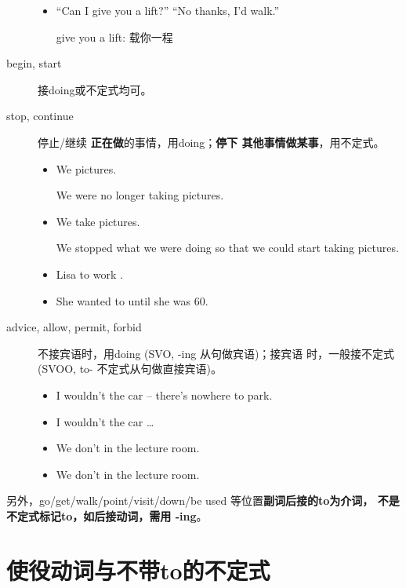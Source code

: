 \begin{description}
\begin{itemize}
  \item ``Can I give you a lift?'' ``No thanks, I'd  walk.''

    give you a lift: 载你一程
  \end{itemize}

\item[begin, start] 接doing或不定式均可。

\item[stop, continue] 停止/继续 \textbf{正在做}的事情，用doing；\textbf{停下
    其他事情做某事}，用不定式。
  \begin{itemize}
  \item We  pictures.

    We were no longer taking pictures.

  \item We  take pictures.

    We stopped what we were doing so that we could start taking pictures.

  \item Lisa  to work .

  \item She wanted to  until she was 60.
  \end{itemize}

\item[advice, allow, permit, forbid] 不接宾语时，用doing (SVO, -ing 从句做宾语)；接宾语
  时，一般接不定式 (SVOO, to- 不定式从句做直接宾语)。
  \begin{itemize}
  \item I wouldn't  the car – there's nowhere to park.
  \item I wouldn't  the car …
  \item We don't  in the lecture room.
  \item We don't  in the lecture room.
  \end{itemize}
\end{description}

另外，go/get/walk/point/visit/down/be used 等位置\textbf{副词后接的to为介词，
  不是不定式标记to，如后接动词，需用 -ing}。

\section{使役动词与不带to的不定式}

